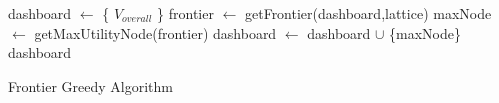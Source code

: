 \begin{algorithm}
  \begin{algorithmic}[1]
  \State dashboard $\gets$ \{ $V_{overall}$ \}
      \State frontier $\gets$ getFrontier(dashboard,lattice)
      \State maxNode $\gets$ getMaxUtilityNode(frontier)
      \State dashboard $\gets$ dashboard $\cup$ \{maxNode\}
  \EndWhile
  \Return dashboard
  \EndProcedure
  \end{algorithmic}
  \caption{Frontier Greedy Algorithm}\label{algo:frontier_greedy}
\end{algorithm}
\vspace{-15pt}
